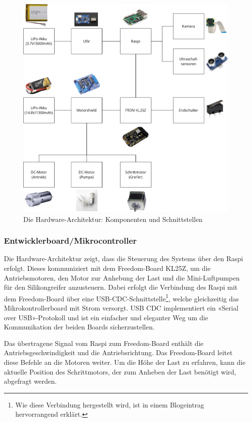 \begin{figure}
    \includegraphics[width=\linewidth]{graphs/schnittstellen.png}
    \caption{Die Hardware-Architektur: Komponenten und Schnittstellen}
    \label{fig:hardware-architektur}
\end{figure}

\subsubsection{Entwicklerboard/Mikrocontroller}

Die Hardware-Architektur zeigt, dass die Steuerung des Systems über den Raspi erfolgt. Dieses kommuniziert mit dem Freedom-Board KL25Z, um die Antriebsmotoren, den Motor zur Anhebung der Last und die Mini-Luftpumpen für den Silikongreifer anzusteuern. Dabei erfolgt die Verbindung des Raspi  mit dem Freedom-Board über eine USB-CDC-Schnittstelle\footnote{Wie diese Verbindung hergestellt wird, ist in einem Blogeintrag  hervorrangend erklärt.}, welche gleichzeitig das Mikrokontrollerboard mit Strom versorgt. USB CDC implementiert ein «Serial over USB»-Protokoll und ist ein einfacher und eleganter Weg um die Kommunikation der beiden Boards sicherzustellen.

Das übertragene Signal vom Raspi zum Freedom-Board enthält die Antriebsgeschwindigkeit und die Antriebsrichtung. Das Freedom-Board leitet diese Befehle an die Motoren weiter. Um die Höhe der Last zu erfahren, kann die aktuelle Position des Schrittmotors, der zum Anheben der Last benötigt wird, abgefragt werden.

